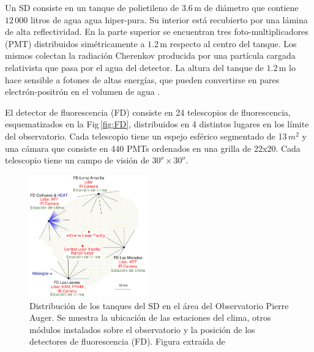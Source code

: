 Un SD consiste en un tanque de polietileno de $3.6\,$m de diámetro que contiene $12\,000$ litros de agua agua hiper-pura. Su interior está recubierto por una lámina de alta reflectividad. En la parte superior se encuentran tres foto-multiplicadores (PMT) distribuidos simétricamente  a $1.2\,$m respecto al centro del tanque. Los mismos colectan la radiación Cherenkov producida por una partícula cargada relativista que pasa por el agua del detector. La altura del tanque de $1.2\,$m lo hace sensible a fotones de altas energías, que pueden convertirse en pares electrón-positrón en el volumen de agua \cite{como_funciona_auger}.

El detector de fluorescencia (FD) consiste en 24 telescopios de fluorescencia, esquematizados en la Fig\,\ref{fig:FD}, distribuidos en 4 distintos lugares en los límite del observatorio. %
Cada telescopio tiene un espejo esférico segmentado de 13$\,m^2$ y una cámara que consiste en 440 PMTs ordenados en una grilla de 22x20. Cada telescopio tiene un campo de visión de $30^o\times30^o$.%

\begin{figure}[H]
	\centering
	\includegraphics[width=0.45\textwidth]{auger_sd.png}
	\caption{Distribución de los tanques del SD en el área del Observatorio Pierre Auger. Se muestra la ubicación de las estaciones del clima, otros módulos instalados sobre el observatorio y la posición de los detectores de fluorescencia (FD). Figura extraída de \cite{como_funciona_auger}}
	\label{fig:auger_sd}
\end{figure}

